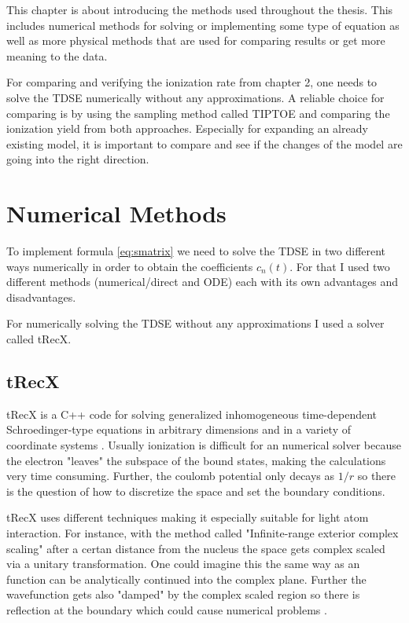 This chapter is about introducing the methods used throughout the thesis.
This includes numerical methods for solving or implementing some type of equation as well as more physical methods that are used for comparing results or get more meaning to the data.

For comparing and verifying the ionization rate from chapter 2, one needs to solve the TDSE numerically without any approximations.
A reliable choice for comparing is by using the sampling method called TIPTOE \cite{Park:18} and comparing the ionization yield from both approaches.
Especially for expanding an already existing model, it is important to compare and see if the changes of the model are going into the right direction.



\section{Numerical Methods}
To implement formula \ref{eq:smatrix} we need to solve the TDSE in two different ways numerically in order to obtain the coefficients $c_n(t)$. 
For that I used two different methods (numerical/direct and ODE) each with its own advantages and disadvantages.

For numerically solving the TDSE without any approximations I used a solver called tRecX.




\subsection{tRecX}
tRecX is a C++ code for solving generalized inhomogeneous time-dependent
Schroedinger-type equations in arbitrary dimensions and in a variety of coordinate systems \cite{Scrinzi_trecx}.
Usually ionization is difficult for an numerical solver because the electron "leaves" the subspace of the bound states, making the calculations very time consuming.
Further, the coulomb potential only decays as $1/r$ so there is the question of how to discretize the space and set the boundary conditions.

tRecX uses different techniques making it especially suitable for light atom interaction. 
For instance, with the method called "Infinite-range exterior complex scaling" after a certan distance from the nucleus the space gets complex scaled via a unitary transformation.
One could imagine this the same way as an function can be analytically continued into the complex plane.
Further the wavefunction gets also "damped" by the complex scaled region so there is reflection at the boundary which could cause numerical problems \cite{scrinzi_irecs}. 

